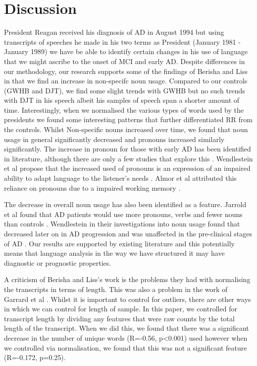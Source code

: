 \documentclass[10pt, letterpaper, twoside, openany]{thesis}
\begin{document}
\section{Discussion}\label{discussion}
President Reagan received his diagnosis of AD in August 1994 but using transcripts of speeches he made in his two terms as President (January 1981 - January 1989) we have be able to identify certain changes in his use of language that we might ascribe to the onset of MCI and early AD. Despite differences in our methodology, our research supports some of the findings of Berisha and Liss in that we find an increase in non-specifc noun usage. Compared to our controls (GWHB and DJT), we find some slight trends with GWHB but no such trends with DJT in his speech albeit his samples of speech span a shorter amount of time. Interestingly, when we normalised the various types of words used by the presidents we found some interesting patterns that further differentiated RR from the controls. Whilst Non-specific nouns increased over time, we found that noun usage in general significantly decreased and pronouns increased similarly significantly. The increase in pronoun for those with early AD has been identified in literature, although there are only a few studies that explore this \cite{Wendelstein2015}. Wendlestein et al propose that the increased used of pronouns is an expression of an impaired ability to adapt language to the listener's needs \cite{Wendelstein2015}. Almor et al attributed this reliance on pronouns due to a impaired working memory \cite{Almor1999}.
\par 
The decrease in overall noun usage has also been identified as a feature. Jarrold et al found that AD patients would use more pronouns, verbs and fewer nouns than controls \cite{Jarrold2014}. Wendlestein in their investigations into noun usage found that decreased later on in AD progression and was unaffected in the pre-clinical stages of AD \cite{Wendelstein2014}. Our results are supported by existing literature and this potentially means that language analysis in the way we have structured it may have diagnostic or prognostic properties.
\par 
A criticism of Berisha and Liss's work is the problems they had with normalising the transcripts in terms of length. This was also a problem in the work of Garrard et al \cite{Garrard2005, Le2011}. Whilst it is important to control for outliers, there are other ways in which we can control for length of sample. In this paper, we controlled for transcript length by dividing any features that were raw counts by the total length of the transcript. When we did this, we found that there was a significant decrease in the number of unique words (R=-0.56, p\textless0.001) used however when we controlled via normalisation, we found that this was not a significant feature (R=-0.172, p=0.25). 
\end{document}
